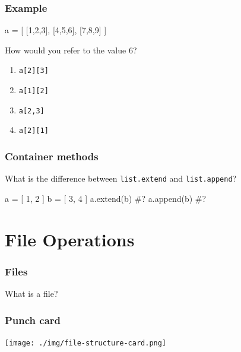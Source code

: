 \documentclass[11pt]{beamer}
\begin{document}
\begin{frame}[fragile]
  \frametitle{Example}
  \Enlarge

  \begin{semiverbatim}
a = [ [1,2,3], [4,5,6], [7,8,9] ]
  \end{semiverbatim}
  How would you refer to the value 6?
  \begin{enumerate}[label=\Alph*]
  \item  \texttt{a[2][3]}
  \item  \texttt{a[1][2]} %
  \item  \texttt{a[2,3]}
  \item  \texttt{a[2][1]}
  \end{enumerate}
\end{frame}

\begin{frame}[fragile]
  \frametitle{Container methods}
  \Enlarge

  \begin{itemize}
  \myitem  What is the difference between \texttt{list.extend} and \texttt{list.append}?
  \end{itemize}
  \begin{semiverbatim}
a = [ 1, 2 ]
b = [ 3, 4 ]
a.extend(b)  #?
a.append(b)  #?
  \end{semiverbatim}
\end{frame}

\section{File Operations}

\begin{frame}[fragile]
  \frametitle{Files}
  \Enlarge

  \begin{itemize}
  \myitem  What is a file?
  \end{itemize}
\end{frame}

\begin{frame}[fragile]
  \frametitle{Punch card}

  \texttt{[image: ./img/file-structure-card.png]}
\end{frame}
\end{document}
